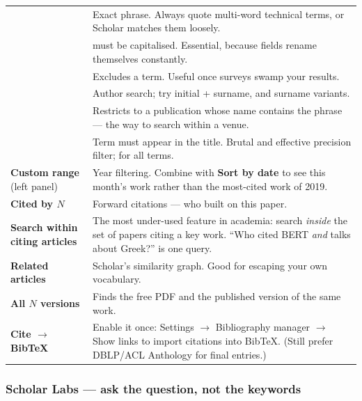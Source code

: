 \documentclass[11pt,a4paper]{article}
\begin{document}
\begin{table}[h]
\centering
\small
\begin{tabularx}{\textwidth}{L{5.0cm} X}
\toprule
{} &  \\
\midrule
{}
 & Exact phrase. Always quote multi-word technical
terms, or Scholar matches them loosely. \\
 &  must be capitalised. Essential,
because fields rename themselves constantly. \\
 & Excludes a term. Useful once surveys swamp your
results. \\
 & Author search; try initial + surname, and
surname variants. \\
 & Restricts to a publication whose name
contains the phrase --- the way to search within a venue. \\
 & Term must appear in the title. Brutal and
effective precision filter;  for all terms. \\
\textbf{Custom range} (left panel) & Year filtering. Combine with
\textbf{Sort by date} to see this month's work rather than the most-cited work
of 2019. \\
\textbf{Cited by $N$} & Forward citations --- who built on this paper. \\
\textbf{Search within citing articles} & The most under-used feature in
academia: search \emph{inside} the set of papers citing a key work. ``Who cited
BERT \emph{and} talks about Greek?'' is one query. \\
\textbf{Related articles} & Scholar's similarity graph. Good for escaping your
own vocabulary. \\
\textbf{All $N$ versions} & Finds the free PDF and the published version of the
same work. \\
\textbf{Cite $\rightarrow$ BibTeX} & Enable it once: Settings $\rightarrow$
Bibliography manager $\rightarrow$ Show links to import citations into BibTeX.
(Still prefer DBLP/ACL Anthology for final entries.) \\
\bottomrule
\end{tabularx}
\end{table}

\subsubsection*{Scholar Labs --- ask the question, not the keywords}
\end{document}
